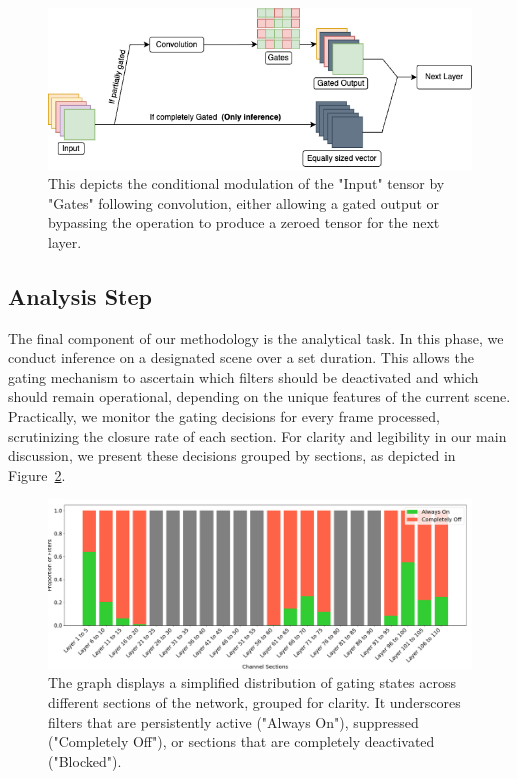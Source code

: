 \documentclass[runningheads]{llncs}
\begin{document}
\begin{figure}[ht]
\centering
\includegraphics[width=\linewidth]{./Images/gated_convolution.png}
\caption{This depicts the conditional modulation of the "Input" tensor by "Gates" following convolution, either allowing a gated output or bypassing the operation to produce a zeroed tensor for the next layer.}
\label{fig:gating_mechanism}
\end{figure}

\subsection{Analysis Step}

The final component of our methodology is the analytical task. In this phase, we conduct inference on a designated scene over a set duration. This allows the gating mechanism to ascertain which filters should be deactivated and which should remain operational, depending on the unique features of the current scene. Practically, we monitor the gating decisions for every frame processed, scrutinizing the closure rate of each section. For clarity and legibility in our main discussion, we present these decisions grouped by sections, as depicted in Figure~\ref{fig:gating_analysis}.

\begin{figure}[htbp]
\centering
\includegraphics[width=\textwidth]{./Images/fixed_grouping_gating_analysis.png}
\caption{The graph displays a simplified distribution of gating states across different sections of the network, grouped for clarity. It underscores filters that are persistently active ("Always On"), suppressed ("Completely Off"), or sections that are completely deactivated ("Blocked").}
\label{fig:gating_analysis}
\end{figure}
\end{document}
